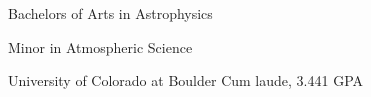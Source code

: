 {}
{Bachelors of Arts in Astrophysics

Minor in Atmospheric Science} %
{University of Colorado at Boulder} %
{Cum laude, 3.441 GPA}
{}